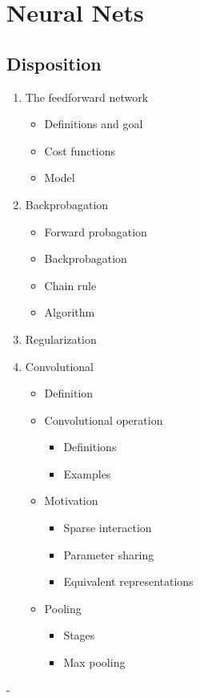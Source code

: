 \documentclass[a4, english]{article}
\begin{document}
\section{Neural Nets}
\subsection{Disposition}
\begin{enumerate}
	\item The feedforward network
  \begin{itemize}
    \item Definitions and goal
    \item Cost functions 
    \item Model
  \end{itemize}
  \item Backprobagation 
  \begin{itemize}
  	\item Forward probagation
    \item Backprobagation
    \item Chain rule
    \item Algorithm
  \end{itemize}
  \item Regularization
  \item Convolutional
  \begin{itemize}
  	\item Definition
    \item Convolutional operation
    \begin{itemize}
    	\item Definitions
      \item Examples 
    \end{itemize}
    \item Motivation
    \begin{itemize}
    	\item Sparse interaction
      \item Parameter sharing
      \item Equivalent representations 
    \end{itemize}
    \item Pooling
    \begin{itemize}
    	\item Stages
      \item Max pooling
    \end{itemize}
  \end{itemize}
\end{enumerate}-
\newpage 
\end{document}

